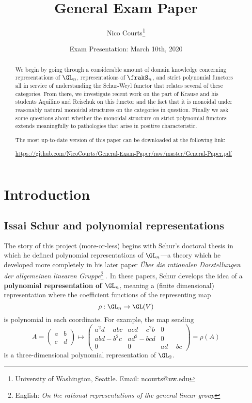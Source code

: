\documentclass[12pt]{article}
\begin{document}
\title{General Exam Paper \vspace{-1ex}}
\author{Nico Courts\footnote{University of Washington, Seattle. Email: ncourts@uw.edu}}
\date{Exam Presentation: March 10th, 2020}
\maketitle

\begin{abstract}
	We begin by going through a considerable amount of domain knowledge concerning representations of $\GL_n$,
	representations of $\frakS_n$, and strict polynomial functors all in service of understanding the Schur-Weyl 
	functor that relates several of these categories. From there, we investigate recent work on the part of Krause 
	and his students Aquilino and Reischuk on this functor and the fact that it is monoidal under reasonably natural monoidal structures on 
	the categories in question. Finally we ask some questions about whether the monoidal structure on strict polynomial functors 
	extends meaningfully to pathologies that arise in positive characteristic.

	{\footnotesize The most up-to-date version of this paper can be downloaded at the following link: 
	\begin{center}
		\url{https://github.com/NicoCourts/General-Exam-Paper/raw/master/General-Paper.pdf}
	\end{center}}
\end{abstract}

\newpage
\tableofcontents

\newpage
\section{Introduction}
\subsection{Issai Schur and polynomial representations}
The story of this project (more-or-less) begins with Schur's doctoral thesis \cite{schur-thesis} in which he defined
polynomial representations of $\GL_n$---a theory which he developed more completely in his later paper \textit{\"Uber die 
rationalen Darstellungen der allgemeinen linearen Gruppe}\footnote{English: \textit{On the rational representations of the general linear group}}
\cite{schur-rational}. In these papers, Schur develops the idea of a \textbf{polynomial representation of $\GL_n$},
meaning a (finite dimensional) representation where the coefficient functions of the representing map 
\[\rho:\GL_n\to \GL(V)\]
is polynomial in each coordinate. For example, the map sending 
\[A=\begin{pmatrix}
	a&b\\
	c&d
\end{pmatrix}\mapsto \begin{pmatrix}
	a^2d-abc & acd-c^2b & 0\\
	abd-b^2c & ad^2-bcd & 0\\
	0 & 0 & ad-bc
\end{pmatrix}=\rho(A)\]
is a three-dimensional polynomial representation of $\GL_2$.
\end{document}

